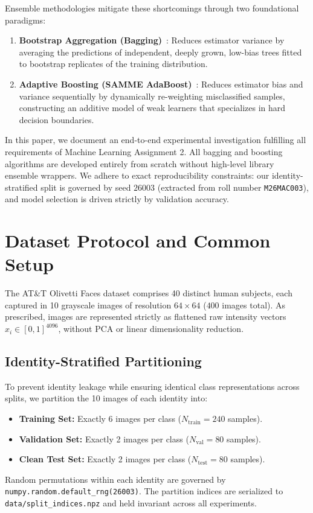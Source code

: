 \documentclass[10pt,twocolumn,letterpaper]{article}
\begin{document}
Ensemble methodologies mitigate these shortcomings through two foundational paradigms:
\begin{enumerate}[leftmargin=*]
    \item \textbf{Bootstrap Aggregation (Bagging)}~\cite{breiman1996bagging}: Reduces estimator variance by averaging the predictions of independent, deeply grown, low-bias trees fitted to bootstrap replicates of the training distribution.
    \item \textbf{Adaptive Boosting (SAMME AdaBoost)}~\cite{hastie2009samme}: Reduces estimator bias and variance sequentially by dynamically re-weighting misclassified samples, constructing an additive model of weak learners that specializes in hard decision boundaries.
\end{enumerate}

In this paper, we document an end-to-end experimental investigation fulfilling all requirements of Machine Learning Assignment 2. All bagging and boosting algorithms are developed entirely from scratch without high-level library ensemble wrappers. We adhere to exact reproducibility constraints: our identity-stratified split is governed by seed $26003$ (extracted from roll number \texttt{M26MAC003}), and model selection is driven strictly by validation accuracy.

\section{Dataset Protocol and Common Setup}
\label{sec:setup}
The AT\&T Olivetti Faces dataset comprises 40 distinct human subjects, each captured in 10 grayscale images of resolution $64 \times 64$ ($400$ images total). As prescribed, images are represented strictly as flattened raw intensity vectors $x_i \in [0, 1]^{4096}$, without PCA or linear dimensionality reduction.

\subsection{Identity-Stratified Partitioning}
To prevent identity leakage while ensuring identical class representations across splits, we partition the 10 images of each identity into:
\begin{itemize}[leftmargin=*]
    \item \textbf{Training Set:} Exactly 6 images per class ($N_{\text{train}} = 240$ samples).
    \item \textbf{Validation Set:} Exactly 2 images per class ($N_{\text{val}} = 80$ samples).
    \item \textbf{Clean Test Set:} Exactly 2 images per class ($N_{\text{test}} = 80$ samples).
\end{itemize}
Random permutations within each identity are governed by \texttt{numpy.random.default\_rng(26003)}. The partition indices are serialized to \texttt{data/split\_indices.npz} and held invariant across all experiments.
\end{document}
